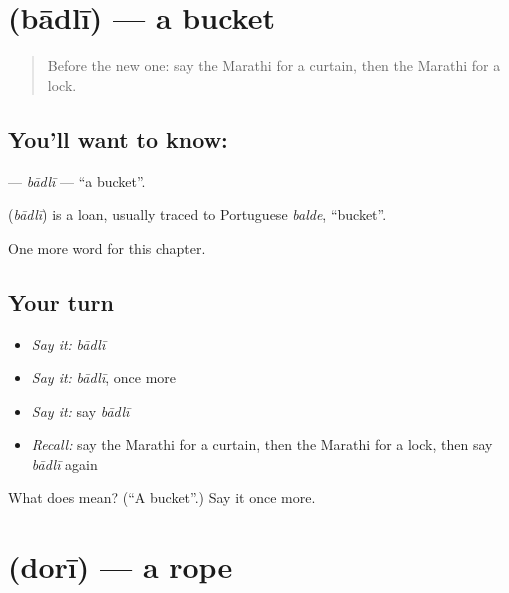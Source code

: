 \section[\texorpdfstring{\mr{बादली} (bādlī)}{बादली (bādlī)}]{ (bādlī) — a bucket}

\label{lesson:MR-C131-badli}



\begin{quote}
Before the new one: say the Marathi for a curtain, then the Marathi for a lock.
\end{quote}

\subsection*{You'll want to know: }
\textbf{} — \emph{bādlī} — \textquotedblleft{}a bucket\textquotedblright{}.

\begin{cousinweb}
\textbf{} (\emph{bādlī}) is a loan, usually traced to Portuguese \emph{balde}, \textquotedblleft{}bucket\textquotedblright{}.
\end{cousinweb}

\begin{grammarlens}[title={What you've built}]
One more word for this chapter.
\end{grammarlens}

\subsection*{Your turn}
\begin{itemize}
\raggedright
  \item \emph{Say it:} \emph{bādlī}
  \item \emph{Say it:} \emph{bādlī}, once more
  \item \emph{Say it:} say \emph{bādlī}
  \item \emph{Recall:} say the Marathi for a curtain, then the Marathi for a lock, then say \emph{bādlī} again
\end{itemize}

\begin{tcolorbox}[breakable,colback=teal!4,colframe=teal!35!black,title={Before you move on}]
What does  mean? (\textquotedblleft{}A bucket\textquotedblright{}.) Say it once more.
\end{tcolorbox}
\section[\texorpdfstring{\mr{दोरी} (dorī)}{दोरी (dorī)}]{ (dorī) — a rope}

